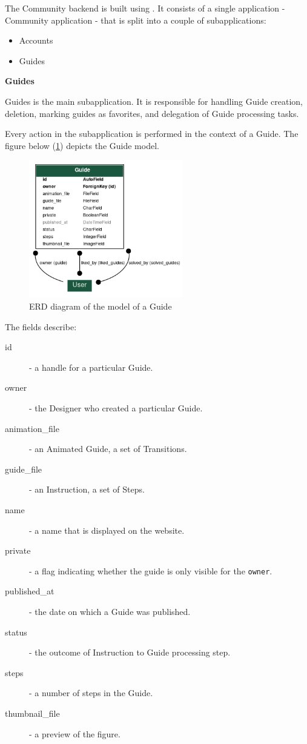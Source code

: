The Community backend is built using . It consists of a single application - Community application - that is split into a couple of subapplications:

\begin{itemize}
	\item Accounts
	\item Guides
\end{itemize}

\textbf{Guides}

Guides is the main subapplication. It is responsible for handling Guide creation, deletion, marking guides as favorites, and delegation of Guide processing tasks.

\medskip

Every action in the subapplication is performed in the context of a Guide. The figure below (\ref{model--guide}) depicts the Guide model.

\begin{figure}[H]
  \caption{ERD diagram of the model of a Guide}
  \label{model--guide}
  \centering
    \includegraphics[width=0.6\textwidth]{assets/3-erd-guides.png}
\end{figure}

The fields describe: \begin{description}
	\item[id] - a handle for a particular Guide.
	\item[owner] - the Designer who created a particular Guide.
	\item[animation\_file] - an Animated Guide, a set of Transitions.
	\item[guide\_file] - an Instruction, a set of Steps.
	\item[name] - a name that is displayed on the website.
	\item[private] - a flag indicating whether the guide is only visible for the \texttt{owner}.
	\item[published\_at] - the date on which a Guide was published.
	\item[status] - the outcome of Instruction to Guide processing step.
	\item[steps] - a number of steps in the Guide.
	\item[thumbnail\_file] - a preview of the figure.
\end{description}

